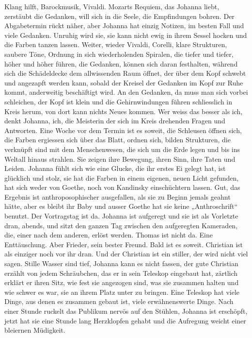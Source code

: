 Klang hilft, Barockmusik, Vivaldi. Mozarts Requiem, das Johanna liebt, zerstäubt die Gedanken, will sich in die Seele, die Empfindungen bohren. 
Der Abgabetermin rückt näher, aber Johanna hat einzig Notizen, im besten Fall und viele Gedanken.
Unruhig wird sie, sie kann nicht ewig in ihrem Sessel hocken und die Farben tanzen lassen. Weiter, wieder Vivaldi, Corelli, klare Strukturen, saubere Töne, Ordnung in sich wiederholenden Spiralen, die tiefer und tiefer, höher und höher führen, die Gedanken, können sich daran festhalten, während sich die Schädeldecke dem allwissenden Raum öffnet, der über dem Kopf schwebt und angezapft werden kann, sobald der Kreisel der Gedanken im Kopf zur Ruhe kommt, anderweitig beschäftigt wird. An den Gedanken, da muss man sich vorbei schleichen, der Kopf ist klein und die Gehirnwindungen führen schliesslich in Kreis herum, von dort kann nichts Neues kommen. Wer weiss das besser als ich, denkt Johanna, ich, die Meisterin der sich im Kreis drehenden Fragen und Antworten.
Eine Woche vor dem Termin ist es soweit, die Schleusen öffnen sich, die Farben ergiessen sich über das Blatt, ordnen sich, bilden Strukturen, die verknüpft sind mit dem Menschenwesen, die sich um die Erde legen und bis ins Weltall hinaus strahlen. Sie zeigen ihre Bewegung, ihren Sinn, ihre Taten und Leiden.
Johanna fühlt sich wie eine Glucke, die ihr erstes Ei gelegt hat, ist glücklich und stolz, sie hat die Farben in einem eigenen, neuen Licht gefunden, hat sich weder von Goethe, noch von Kandinsky einschüchtern lassen. Gut, das Ergebnis ist anthroposophischer ausgefallen, als sie zu Beginn jemals geahnt hätte, aber es bleibt ihr Baby und ausser Goethe hat sie keine „Anthroschrift“ benutzt.
Der Vortragstag ist da. Johanna ist aufgeregt und sie ist als Vorletzte dran, abends, und sitzt den ganzen Tag zwischen den aufgeregten Kameraden, die, einer nach dem anderen, erlöst werden.
Thomas ist nicht da. Eine Enttäuschung. Aber Frieder, sein bester Freund.
Bald ist es soweit. Christian ist als einziger noch vor ihr dran. Und der Christian ist ein stiller, der wird nicht viel sagen. Stille Wasser sind tief, Johanna kann es nicht fassen, der gute Christian erzählt von jedem Schräubchen, das er in sein Teleskop eingebaut hat, zärtlich erklärt er ihren Sitz, wie fest sie angezogen sind, was sie zusammen halten und wie schwer es war, sie an ihrem Platz unter zu bringen. Eine Teleskop hat viele Dinge, aus denen es zusammen gebaut ist, viele erwähnenswerte Dinge. Nach einer Stunde ruckelt das Publikum nervös auf den Stühlen, Johanna ist erschöpft, jetzt hat sie eine Stunde lang Herzklopfen gehabt und die Aufregung weicht einer bleiernen Müdigkeit. 
